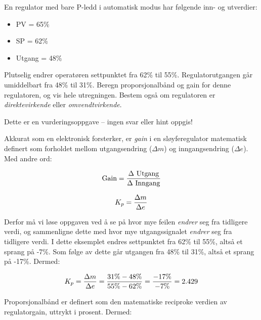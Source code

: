 

En regulator med bare P-ledd i automatisk modus har følgende inn- og utverdier:

\begin{itemize}
\item{} PV = 65\%
\item{} SP = 62\%
\item{} Utgang = 48\%
\end{itemize}

Plutselig endrer operatøren settpunktet fra 62\% til 55\%. Regulatorutgangen går umiddelbart fra 48\% til 31\%. Beregn proporsjonalbånd og gain for denne regulatoren, og vis hele utregningen. Bestem også om regulatoren er {\it direktevirkende} eller {\it omvendtvirkende}.

\vfil

\eject






Dette er en vurderingsoppgave -- ingen svar eller hint oppgis!







Akkurat som en elektronisk forsterker, er {\it gain} i en sløyferegulator matematisk definert som forholdet mellom utgangsendring ($\Delta m$) og inngangsendring ($\Delta e$). Med andre ord:

$$\hbox{Gain} = {\Delta \hbox{ Utgang} \over \Delta \hbox{ Inngang}}$$

$$K_p = {\Delta m \over \Delta e}$$

Derfor må vi løse oppgaven ved å se på hvor mye feilen {\it endrer} seg fra tidligere verdi, og sammenligne dette med hvor mye utgangssignalet {\it endrer} seg fra tidligere verdi. I dette eksemplet endres settpunktet fra 62\% til 55\%, altså et sprang på -7\%. Som følge av dette går utgangen fra 48\% til 31\%, altså et sprang på -17\%. Dermed:

$$K_p = {\Delta m \over \Delta e} = {31\% - 48\% \over 55\% - 62\%} = {-17\% \over -7\%} = 2.429$$

Proporsjonalbånd er definert som den matematiske reciproke verdien av regulatorgain, uttrykt i prosent. Dermed:

